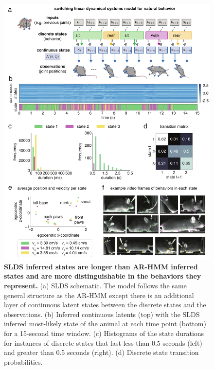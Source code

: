 \begin{figure}[t!]
  \begin{center}
    \includegraphics[width=0.90\linewidth]{ch3-slds/slds-figures/Fig3.pdf}
    \caption[SLDS inferred states are longer than AR-HMM inferred states and are more distinguishable in the behaviors they represent]{\textbf{SLDS inferred states are longer than AR-HMM inferred states and are more distinguishable in the behaviors they represent.} (a) SLDS schematic. The model follows the same general structure as the AR-HMM except there is an additional layer of continuous latent states between the discrete states and the observations. (b) Inferred continuous latents (top) with the SLDS inferred most-likely state of the animal at each time point (bottom) for a 15-second time window. (c) Histograms of the state durations for instances of discrete states that last less than 0.5 seconds (left) and greater than 0.5 seconds (right). (d) Discrete state transition probabilities. }
    \label{fig:slds:3}
  \end{center}
  \vspace{-0.5cm}
\end{figure}
\begin{figure}[t!]
\end{figure}


